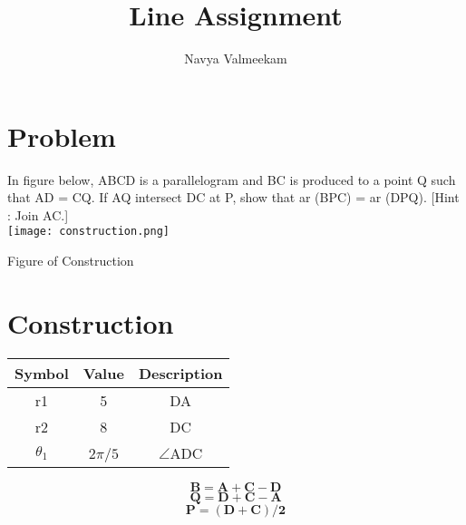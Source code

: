 \documentclass[journal,12pt,twocolumn]{IEEEtran}
\title{Line Assignment}
\author{Navya Valmeekam}
\let\vec\mathbf
\let\vec\mathbf
\begin{document}
\providecommand{\norm}[1]{\left\lVert#1\right\rVert}
\maketitle
\begin{tableofcontents}
\section{Problem}
\noindent In figure below, ABCD is a parallelogram and BC is produced to a point Q such that AD = CQ. If AQ intersect DC at P, show that ar (BPC) = ar (DPQ).
[Hint : Join AC.]\\
\texttt{[image: construction.png]}
\begin{center}
Figure of Construction
\end{center}
\section{Construction}
\begin{center}
\begin{tabular}{|c|c|c|}
\hline
\textbf{Symbol}&{Value}&{Description}\\
\hline
r1&5&DA\\
\hline
r2&8&DC\\
\hline
${\theta}_1$& 2$\pi/5$&$ \angle $ADC\\ 
\hline
\end{tabular}
\end{center}
\begin{center}
\begin{equation}
\vec{B}= \vec{A}+\vec{C}-\vec{D}
\end{equation}
\begin{equation}
\vec{Q}= \vec{D}+\vec{C}-\vec{A}
\end{equation}
\begin{equation}
\vec{P}= \vec{(D+C)/2}
\end{equation}
\end{center}

\end{tableofcontents}
\end{document}
